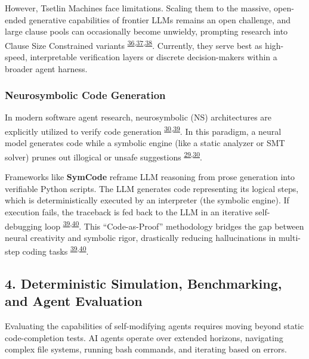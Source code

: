 \documentclass[
  11pt,
]{article}
\begin{document}
However, Tsetlin Machines face limitations. Scaling them to the massive,
open-ended generative capabilities of frontier LLMs remains an open
challenge, and large clause pools can occasionally become unwieldy,
prompting research into Clause Size Constrained variants
\textsuperscript{\protect\hyperlink{cite-36}{36},\protect\hyperlink{cite-37}{37},\protect\hyperlink{cite-38}{38}}.
Currently, they serve best as high-speed, interpretable verification
layers or discrete decision-makers within a broader agent harness.

\hypertarget{neurosymbolic-code-generation}{%
\subsubsection{Neurosymbolic Code
Generation}\label{neurosymbolic-code-generation}}

In modern software agent research, neurosymbolic (NS) architectures are
explicitly utilized to verify code generation
\textsuperscript{\protect\hyperlink{cite-30}{30},\protect\hyperlink{cite-39}{39}}.
In this paradigm, a neural model generates code while a symbolic engine
(like a static analyzer or SMT solver) prunes out illogical or unsafe
suggestions
\textsuperscript{\protect\hyperlink{cite-29}{29},\protect\hyperlink{cite-30}{30}}.

Frameworks like \textbf{SymCode} reframe LLM reasoning from prose
generation into verifiable Python scripts. The LLM generates code
representing its logical steps, which is deterministically executed by
an interpreter (the symbolic engine). If execution fails, the traceback
is fed back to the LLM in an iterative self-debugging loop
\textsuperscript{\protect\hyperlink{cite-39}{39},\protect\hyperlink{cite-40}{40}}.
This ``Code-as-Proof'' methodology bridges the gap between neural
creativity and symbolic rigor, drastically reducing hallucinations in
multi-step coding tasks
\textsuperscript{\protect\hyperlink{cite-39}{39},\protect\hyperlink{cite-40}{40}}.

\hypertarget{deterministic-simulation-benchmarking-and-agent-evaluation}{%
\subsection{4. Deterministic Simulation, Benchmarking, and Agent
Evaluation}\label{deterministic-simulation-benchmarking-and-agent-evaluation}}

Evaluating the capabilities of self-modifying agents requires moving
beyond static code-completion tests. AI agents operate over extended
horizons, navigating complex file systems, running bash commands, and
iterating based on errors.
\end{document}
